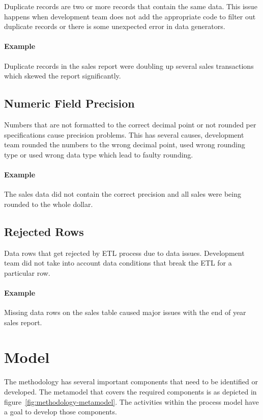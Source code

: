 Duplicate records are two or more records that contain the same data.
This issue happens when development team does not add the appropriate code to filter out duplicate records or there is some unexpected error in data generators.

\paragraph*{Example} Duplicate records in the sales report were doubling up several sales transactions which skewed the report significantly.

\subsection*{Numeric Field Precision}

Numbers that are not formatted to the correct decimal point or not rounded per specifications cause precision problems.
This has several causes, development team rounded the numbers to the wrong decimal point, used wrong rounding type or used wrong data type which lead to faulty rounding.

\paragraph*{Example} The sales data did not contain the correct precision and all sales were being rounded to the whole dollar.

\subsection*{Rejected Rows}

Data rows that get rejected by ETL process due to data issues.
Development team did not take into account data conditions that break the ETL for a particular row.

\paragraph*{Example} Missing data rows on the sales table caused major issues with the end of year sales report.


\section{Model}

The methodology has several important components that need to be identified or developed.
The metamodel that covers the required components is as depicted in figure~\ref{fig:methodology-metamodel}.
The activities within the process model have a goal to develop those components.


